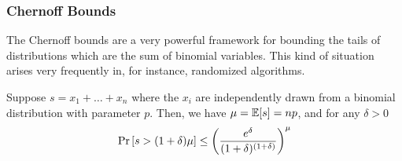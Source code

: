 \subsubsection{Chernoff Bounds}
\label{sec:prob:conc:chernoff}
The Chernoff bounds are a very powerful framework for bounding the tails
of distributions which are the sum of binomial variables. This
kind of situation arises very frequently in, for instance, randomized
algorithms.
\begin{theorem}
    Suppose $s = x_1 + \dots + x_n$ where the $x_i$ are independently
    drawn from a binomial distribution with parameter $p$. Then,
    we have $\mu = \mathbb{E}[s] = np$, and for any $\delta > 0$
    \begin{align*}
        \Pr \left[ s > (1 + \delta)\mu\right] \leq \left(\frac{e^\delta}{(1 + \delta)^{(1 +  \delta)}}\right)^\mu
    \end{align*}
\end{theorem}
